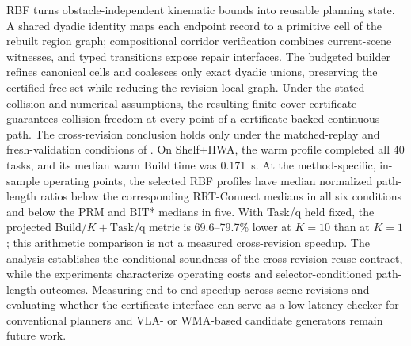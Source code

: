 \documentclass[journal]{IEEEtran}
\newcommand{\rbf}{RBF}
\begin{document}
\rbf{} turns obstacle-independent kinematic bounds into reusable planning
state. A shared dyadic identity maps each endpoint record to a primitive cell of
the rebuilt region graph; compositional corridor verification combines
current-scene witnesses, and typed transitions expose repair interfaces. The budgeted
builder refines canonical cells and coalesces only exact dyadic unions,
preserving the certified free set while reducing the revision-local graph.
Under the stated collision and numerical assumptions, the resulting
finite-cover certificate guarantees collision freedom at every point of a
certificate-backed continuous path. The cross-revision conclusion holds only
under the matched-replay and fresh-validation conditions of
. On Shelf+IIWA, the
warm profile completed all 40 tasks, and its median warm Build time was
0.171~s. At the method-specific, in-sample operating points, the selected
\rbf{} profiles have median normalized path-length ratios below the
corresponding RRT-Connect medians in all six conditions and below the PRM and
BIT* medians in five. With Task/q held fixed, the projected
$\mathrm{Build}/K+\mathrm{Task/q}$ metric is 69.6--79.7\% lower at $K=10$ than
at $K=1$; this arithmetic comparison is not a measured cross-revision speedup.
The analysis establishes the conditional soundness of the cross-revision reuse
contract,
while the experiments characterize operating costs and selector-conditioned
path-length outcomes. Measuring end-to-end speedup across scene revisions and
evaluating whether the certificate interface can serve as a low-latency checker
for conventional planners and VLA- or WMA-based candidate generators remain
future work.

\FloatBarrier


\end{document}
